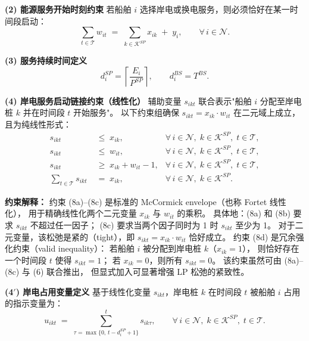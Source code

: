 \documentclass[11pt,a4paper]{article}
\begin{document}
\medskip
\noindent\textbf{(2) 能源服务开始时刻约束}\quad
若船舶 $i$ 选择岸电或换电服务，则必须恰好在某一时间段启动：
%
\begin{equation}
  \sum_{t \in \mathcal{T}} w_{it}
  \;=\; \sum_{k \in \mathcal{K}^{SP}} x_{ik} \;+\; y_i,
  \qquad \forall\, i \in \mathcal{N}.
  \tag{6}
\end{equation}

\medskip
\noindent\textbf{(3) 服务持续时间定义}
%
\begin{equation}
  d_i^{SP} = \left\lceil \frac{E_i}{P^{SP}} \right\rceil, \qquad
  d_i^{BS} = T^{BS}.
  \tag{7}
\end{equation}


\medskip
\noindent\textbf{(4) 岸电服务启动链接约束（线性化）}\quad
辅助变量 $s_{ikt}$ 联合表示"船舶 $i$ 分配至岸电桩 $k$ 并在时间段 $t$ 开始服务"。
以下约束组确保 $s_{ikt} = x_{ik} \cdot w_{it}$ 在二元域上成立，且为纯线性形式：
%
\begin{align}
  s_{ikt} &\;\leq\; x_{ik},
    & \forall\, i \in \mathcal{N},\; k \in \mathcal{K}^{SP},\; t \in \mathcal{T},
    \tag{8a} \\[4pt]
  s_{ikt} &\;\leq\; w_{it},
    & \forall\, i \in \mathcal{N},\; k \in \mathcal{K}^{SP},\; t \in \mathcal{T},
    \tag{8b} \\[4pt]
  s_{ikt} &\;\geq\; x_{ik} + w_{it} - 1,
    & \forall\, i \in \mathcal{N},\; k \in \mathcal{K}^{SP},\; t \in \mathcal{T},
    \tag{8c} \\[4pt]
  \sum_{t \in \mathcal{T}} s_{ikt} &\;=\; x_{ik},
    & \forall\, i \in \mathcal{N},\; k \in \mathcal{K}^{SP}.
    \tag{8d}
\end{align}

\noindent\textbf{约束解释：}
约束 (8a)--(8c) 是标准的 McCormick envelope（也称 Fortet 线性化），
用于精确线性化两个二元变量 $x_{ik}$ 与 $w_{it}$ 的乘积。
具体地：(8a) 和 (8b) 要求 $s_{ikt}$ 不超过任一因子；
(8c) 要求当两个因子同时为 1 时 $s_{ikt}$ 至少为 1。
对于二元变量，该松弛是紧的（tight），即 $s_{ikt} = x_{ik} \cdot w_{it}$ 恰好成立。
约束 (8d) 是冗余强化约束（valid inequality）：
若船舶 $i$ 被分配到岸电桩 $k$（$x_{ik}=1$），
则恰好存在一个时间段 $t$ 使得 $s_{ikt}=1$；
若 $x_{ik}=0$，则所有 $s_{ikt}=0$。
该约束虽然可由 (8a)--(8c) 与 (6) 联合推出，
但显式加入可显著增强 LP 松弛的紧致性。

\medskip
\noindent\textbf{(4$'$) 岸电占用变量定义}\quad
基于线性化变量 $s_{ikt}$，岸电桩 $k$ 在时间段 $t$ 被船舶 $i$ 占用的指示变量为：
%
\begin{equation}
  u_{ikt} \;=\; \sum_{\tau = \max\{0,\, t - d_i^{SP} + 1\}}^{t} s_{ik\tau},
  \qquad \forall\, i \in \mathcal{N},\; k \in \mathcal{K}^{SP},\; t \in \mathcal{T}.
  \tag{9}
\end{equation}
\end{document}
